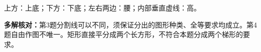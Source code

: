 
\begingroup\color{answerred}上方：上底；下方：下底；左右两边：腰；内部垂直虚线：高。\par\endgroup
{}
\begingroup\color{answerred}\par\noindent\begin{center}\end{center}\par\endgroup
{}
\begingroup\color{answerred}\par\noindent\begin{center}\end{center}\par\endgroup
{}
\begingroup\color{answerred}\par\noindent\begin{center}\end{center}\par\endgroup

\begingroup\color{answerred}\textbf{多解核对：}第3题分割线可以不同，须保证分出的图形种类、全等要求均成立。第4题自由作图不唯一。矩形直接平分成两个长方形，不符合本题分成两个梯形的要求。\par\endgroup
